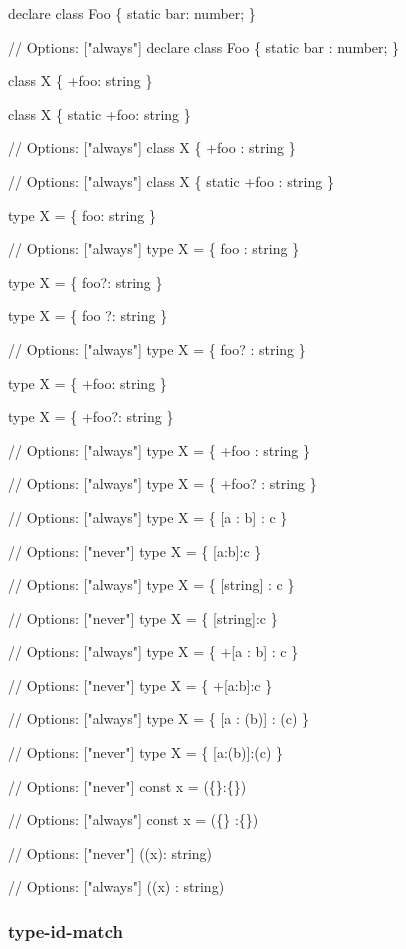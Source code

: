 \begin{DoxyCode}
declare class Foo \{ static bar: number; \}

// Options: ["always"]
declare class Foo \{ static bar : number; \}

class X \{ +foo: string \}

class X \{ static +foo: string \}

// Options: ["always"]
class X \{ +foo : string \}

// Options: ["always"]
class X \{ static +foo : string \}

type X = \{ foo: string \}

// Options: ["always"]
type X = \{ foo : string \}

type X = \{ foo?: string \}

type X = \{ foo   ?: string \}

// Options: ["always"]
type X = \{ foo? : string \}

type X = \{ +foo: string \}

type X = \{ +foo?: string \}

// Options: ["always"]
type X = \{ +foo : string \}

// Options: ["always"]
type X = \{ +foo? : string \}

// Options: ["always"]
type X = \{ [a : b] : c \}

// Options: ["never"]
type X = \{ [a:b]:c \}

// Options: ["always"]
type X = \{ [string] : c \}

// Options: ["never"]
type X = \{ [string]:c \}

// Options: ["always"]
type X = \{ +[a : b] : c \}

// Options: ["never"]
type X = \{ +[a:b]:c \}

// Options: ["always"]
type X = \{ [a : (b)] : (c) \}

// Options: ["never"]
type X = \{ [a:(b)]:(c) \}

// Options: ["never"]
const x = (\{\}:\{\})

// Options: ["always"]
const x = (\{\} :\{\})

// Options: ["never"]
((x): string)

// Options: ["always"]
((x) : string)
\end{DoxyCode}


\label{_eslint-plugin-flowtype-rules-type-id-match}%
 \subsubsection*{{\ttfamily type-\/id-\/match}}

